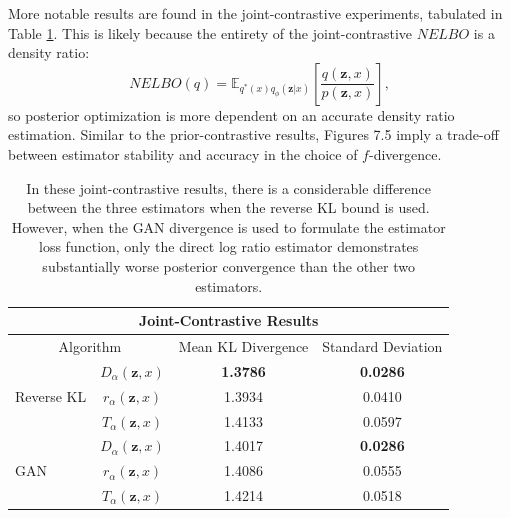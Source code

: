 \documentclass[honours,12pt, twoside]{unswthesis}
\newcommand{\E}{\mathbb{E}}
\numberwithin{equation}{section}
\theoremstyle{definition}
\begin{document}
\newpage
More notable results are found in the joint-contrastive experiments, tabulated in Table \ref{tab:7.2}. This is likely because the entirety of the joint-contrastive $NELBO$ is a density ratio: \[NELBO(q)=\E_{q^*(x)q_\phi(\bm{z}|x)}\left[\frac{q(\bm{z},x)}{p(\bm{z},x)}\right],\] so posterior optimization is more dependent on an accurate density ratio estimation. Similar to the prior-contrastive results, Figures 7.5 imply a trade-off between estimator stability and accuracy in the choice of $f$-divergence.
\begin{table}[h]
\centering
\begin{tabular}{|l|c|c|c|}
\hline
\multicolumn{4}{|c|}{Joint-Contrastive Results}\\
\hline
\multicolumn{2}{|c|}{Algorithm} & Mean KL Divergence & Standard Deviation\\
\hline
\multirow{3}{*}{Reverse KL} & $D_\alpha(\bm{z},x)$ & \textbf{1.3786} & \textbf{0.0286}\\
\cline{2-4}
& $r_\alpha(\bm{z},x)$ & 1.3934 & 0.0410\\
\cline{2-4}
& $T_\alpha(\bm{z},x)$ & 1.4133 & 0.0597\\
\hline
\multirow{3}{*}{GAN} & $D_\alpha(\bm{z},x)$ & 1.4017 & \textbf{0.0286}\\
\cline{2-4}
& $r_\alpha(\bm{z},x)$ & 1.4086 & 0.0555\\
\cline{2-4}
& $T_\alpha(\bm{z},x)$ & 1.4214 & 0.0518\\
\hline
\end{tabular}
\caption{\small In these joint-contrastive results, there is a considerable difference between the three estimators when the reverse KL bound is used. However, when the GAN divergence is used to formulate the estimator loss function, only the direct log ratio estimator demonstrates substantially worse posterior convergence than the other two estimators.}
\label{tab:7.2}
\end{table}
\end{document}
